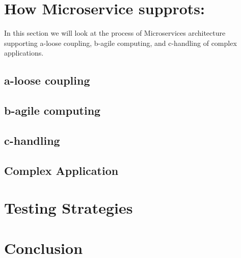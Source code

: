 \documentclass{IEEEtran}
\begin{document}
	\section{How Microservice supprots:}
		In this section we will look at the process of Microservices architecture supporting a-loose coupling, b-agile computing, and c-handling of complex applications.

		\subsection{a-loose coupling}
		\subsection{b-agile computing}
		\subsection{c-handling}
		\subsection{Complex Application}
	

	\section{Testing Strategies}
	\section{Conclusion}
	




	\newpage
	
	
\end{document}

